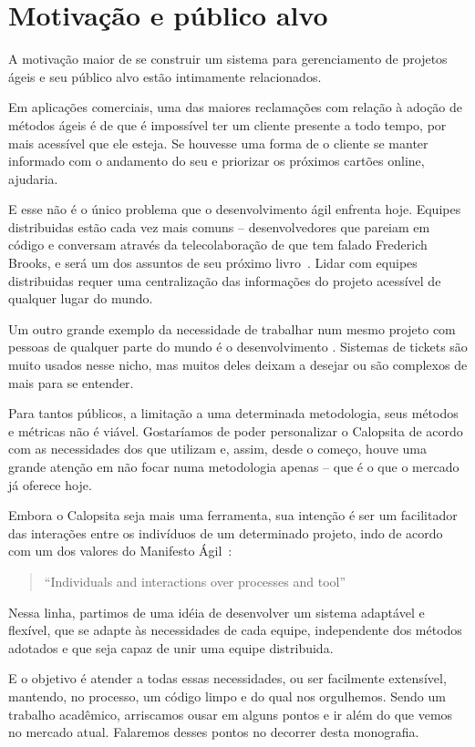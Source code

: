 \section{Motivação e público alvo}

A motivação maior de se construir um sistema para gerenciamento de projetos ágeis e seu público alvo estão intimamente relacionados. 

Em aplicações comerciais, uma das maiores reclamações com relação à adoção de métodos ágeis é de que é impossível ter um cliente presente a todo tempo, por mais acessível que ele esteja. Se houvesse uma forma de o cliente se manter informado com o andamento do seu \software e priorizar os próximos cartões online, ajudaria.

E esse não é o único problema que o desenvolvimento ágil enfrenta hoje. Equipes distribuidas estão cada vez mais comuns -- desenvolvedores que pareiam em código e conversam através da telecolaboração de que tem falado Frederich Brooks, e será um dos assuntos de seu próximo livro~\cite{brooks}. Lidar com equipes distribuidas requer uma centralização das informações do projeto acessível de qualquer lugar do mundo.

Um outro grande exemplo da necessidade de trabalhar num mesmo projeto com pessoas de qualquer parte do mundo é o desenvolvimento \opensource. Sistemas de tickets são muito usados nesse nicho, mas muitos deles deixam a desejar ou são complexos de mais para se entender.

Para tantos públicos, a limitação a uma determinada metodologia, seus métodos e métricas não é viável. Gostaríamos de poder personalizar o Calopsita de acordo com as necessidades dos que utilizam e, assim, desde o começo, houve uma grande atenção em não focar numa metodologia apenas -- que é o que o mercado já oferece hoje.

Embora o Calopsita seja mais uma ferramenta, sua intenção é ser um facilitador das interações entre os indivíduos de um determinado projeto, indo de acordo com um dos valores do Manifesto Ágil~\cite{manifesto}:

\begin{quote}
``Individuals and interactions over processes and tool''
\end{quote}

Nessa linha, partimos de uma idéia de desenvolver um sistema adaptável e flexível, que se adapte às necessidades de cada equipe, independente dos métodos adotados e que seja capaz de unir uma equipe distribuida.

E o objetivo é atender a todas essas necessidades, ou ser facilmente extensível, mantendo, no processo, um código limpo e do qual nos orgulhemos. Sendo um trabalho acadêmico, arriscamos ousar em alguns pontos e ir além do que vemos no mercado atual. Falaremos desses pontos no decorrer desta monografia.
